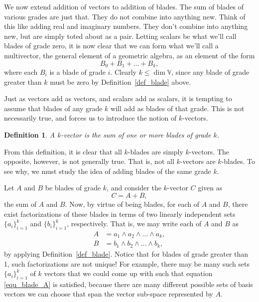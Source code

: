 \documentclass[12pt]{article}
\newcommand{\V}{\mathbb{V}}
\newtheorem{definition}{Definition}[section]
\begin{document}
We now extend addition of vectors to addition of blades.  The sum of blades
of various grades are just that.  They do not combine into anything new.
Think of this like adding real and imaginary numbers.  They don't combine
into anything new, but are simply toted about as a pair.  Letting scalars
be what we'll call blades of grade zero, it is now clear that we can form
what we'll call a multivector, the general element of a geometric algebra,
as an element of the form
\begin{equation}
B_0 + B_1 + \dots + B_k,
\end{equation}
where each $B_i$ is a blade of grade $i$.  Clearly $k\leq\dim\V$, since
any blade of grade greater than $k$ must be zero by Definition~\ref{def_blade} above.

Just as vectors add as vectors, and scalars add as scalars, it is tempting to assume
that blades of any grade $k$ will add as blades of that grade.  This is not necessarily true,
and forces us to introduce the notion of $k$-vectors.
\begin{definition}
A $k$-vector is the sum of one or more blades of grade $k$.
\end{definition}
From this definition, it is clear that all $k$-blades are simply $k$-vectors.
The opposite, however, is not generally true.  That is, not all $k$-vectors are
$k$-blades.  To see why, we must study the idea of adding blades of the
same grade $k$.

Let $A$ and $B$ be blades of grade $k$, and consider the $k$-vector
$C$ given as
\begin{equation}
C = A + B,
\end{equation}
the sum of $A$ and $B$.  Now, by virtue of being blades, for each of
$A$ and $B$, there exist factorizations of these blades in terms of
two linearly independent sets $\{a_i\}_{i=1}^k$ and $\{b_i\}_{i=1}^k$,
respectively.  That is, we may write each of $A$ and $B$ as
\begin{align}
A &= a_1\wedge a_2\wedge\dots\wedge a_k, \label{equ_blade_A}\\
B &= b_1\wedge b_2\wedge\dots\wedge b_k,\label{equ_blade_B}
\end{align}
by applying Definition~\ref{def_blade}.
Notice that for blades of grade greater than 1, such factorizations are not unique!
For example, there may be many such sets $\{a_i\}_{i=1}^k$ of $k$ vectors
that we could come up with such that equation \eqref{equ_blade_A} is satisfied,
because there are many different possible sets of basis vectors we can choose that
span the vector sub-space represented by $A$.
\end{document}
